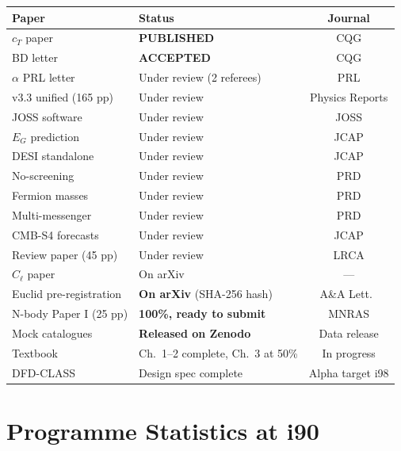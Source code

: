 \documentclass[11pt,a4paper]{article}
\begin{document}
\begin{center}
\begin{tabular}{llc}
\toprule
\textbf{Paper} & \textbf{Status} & \textbf{Journal} \\
\midrule
$c_T$ paper & \textbf{PUBLISHED} & CQG \\
BD letter & \textbf{ACCEPTED} & CQG \\
$\alpha$ PRL letter & Under review (2 referees) & PRL \\
v3.3 unified (165 pp) & Under review & Physics Reports \\
JOSS software & Under review & JOSS \\
$E_G$ prediction & Under review & JCAP \\
DESI standalone & Under review & JCAP \\
No-screening & Under review & PRD \\
Fermion masses & Under review & PRD \\
Multi-messenger & Under review & PRD \\
CMB-S4 forecasts & Under review & JCAP \\
Review paper (45 pp) & Under review & LRCA \\
$C_\ell$ paper & On arXiv & --- \\
Euclid pre-registration & \textbf{On arXiv} (SHA-256 hash) & A\&A Lett.\ \\
N-body Paper I (25 pp) & \textbf{100\%, ready to submit} & MNRAS \\
\midrule
Mock catalogues & \textbf{Released on Zenodo} & Data release \\
Textbook & Ch.\ 1--2 complete, Ch.\ 3 at 50\% & In progress \\
DFD-CLASS & Design spec complete & Alpha target i98 \\
\bottomrule
\end{tabular}
\end{center}

\section{Programme Statistics at i90}
\end{document}
